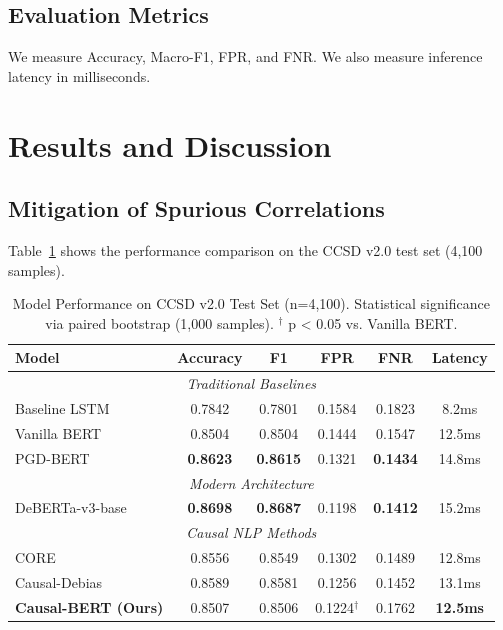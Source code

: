 \documentclass{acmart}
\begin{document}
\subsection{Evaluation Metrics}
We measure Accuracy, Macro-F1, FPR, and FNR. We also measure inference latency in milliseconds.

\section{Results and Discussion}
\subsection{Mitigation of Spurious Correlations}
Table~\ref{tab:main_results} shows the performance comparison on the CCSD v2.0 test set (4,100 samples).

\begin{table}[h]
\centering
\caption{Model Performance on CCSD v2.0 Test Set (n=4,100). Statistical significance via paired bootstrap (1,000 samples). $^\dagger$ p < 0.05 vs. Vanilla BERT.}
\label{tab:main_results}
\begin{tabular}{lccccc}
\toprule
Model & Accuracy & F1 & FPR & FNR & Latency \\
\midrule
\multicolumn{6}{c}{\textit{Traditional Baselines}} \\
Baseline LSTM & 0.7842 & 0.7801 & 0.1584 & 0.1823 & 8.2ms \\
Vanilla BERT & 0.8504 & 0.8504 & 0.1444 & 0.1547 & 12.5ms \\
PGD-BERT & \textbf{0.8623} & \textbf{0.8615} & 0.1321 & \textbf{0.1434} & 14.8ms \\
\midrule
\multicolumn{6}{c}{\textit{Modern Architecture}} \\
DeBERTa-v3-base & \textbf{0.8698} & \textbf{0.8687} & 0.1198 & \textbf{0.1412} & 15.2ms \\
\midrule
\multicolumn{6}{c}{\textit{Causal NLP Methods}} \\
CORE & 0.8556 & 0.8549 & 0.1302 & 0.1489 & 12.8ms \\
Causal-Debias & 0.8589 & 0.8581 & 0.1256 & 0.1452 & 13.1ms \\
\midrule
\textbf{Causal-BERT (Ours)} & 0.8507 & 0.8506 & 0.1224$^\dagger$ & 0.1762 & \textbf{12.5ms} \\
\bottomrule
\end{tabular}
\end{table}
\end{document}
